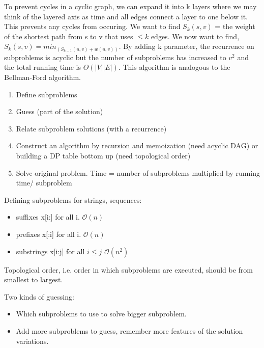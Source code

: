 \documentclass{article}
\begin{document}
    To prevent cycles in a cyclic graph, we can expand it into k layers where we may think of the layered axis as time and all edges connect a layer to one below it. This prevents any cycles from occuring. We want to find $S_k(s,v)$ = the weight of the shortest path from s to v that uses $\leq k$ edges. We now want to find, $S_k(s,v) = min_ (S_{k-1} (u,v) + w(u,v))$. By adding k parameter, the recurrence on subproblems is acyclic but the number of subproblems has increased to $v^2$ and the total running time is $\Theta (|V| |E|)$. This algorithm is analogous to the Bellman-Ford algorithm.
    
    \begin{enumerate}
        \item Define subproblems
        \item Guess (part of the solution)
        \item Relate subproblem solutions (with a recurrence)
        \item Construct an algorithm by recursion and memoization (need acyclic DAG) or building a DP table bottom up (need topological order)
        \item Solve original problem. Time = number of subproblems multiplied by running time/ subproblem
    \end{enumerate}
    
    Defining subproblems for strings, sequences:
    \begin{itemize}
        \item suffixes x[i:] for all i. $\mathcal{O}(n)$
        \item prefixes x[:i] for all i. $\mathcal{O}(n)$
        \item substrings x[i:j] for all $i \leq j$ $\mathcal{O}(n^2)$
    \end{itemize}
    
    Topological order, i.e. order in which subproblems are executed, should be from smallest to largest.
    
    Two kinds of guessing:
    \begin{itemize}
        \item Which subproblems to use to solve bigger subproblem.
        \item Add more subproblems to guess, remember more features of the solution variations.
    \end{itemize}
    
    
\end{document}
